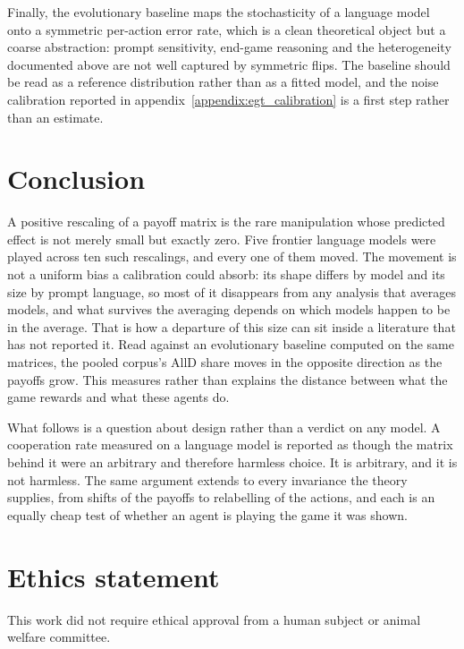 \documentclass[11pt,a4paper]{article}
\begin{document}
Finally, the evolutionary baseline maps the stochasticity of a language model
onto a symmetric per-action error rate, which is a clean theoretical object but
a coarse abstraction: prompt sensitivity, end-game reasoning and the
heterogeneity documented above are not well captured by symmetric flips. The
baseline should be read as a reference distribution rather than as a fitted
model, and the noise calibration reported in
appendix~\ref{appendix:egt_calibration} is a first step rather than an
estimate.


\section{Conclusion}\label{sec:conclusion}

A positive rescaling of a payoff matrix is the rare manipulation whose
predicted effect is not merely small but exactly zero. Five frontier language
models were played across ten such rescalings, and every one of them moved. The
movement is not a uniform bias a calibration could absorb: its shape differs by
model and its size by prompt language, so most of it disappears from any
analysis that averages models, and what survives the averaging depends on which
models happen to be in the average. That is how a departure of this size can
sit inside a literature that has not reported it. Read against an evolutionary
baseline computed on the same matrices, the pooled corpus's AllD share moves in
the opposite direction as the payoffs grow. This measures rather than explains
the distance between what the game rewards and what these agents do.

What follows is a question about design rather than a verdict on any model. A
cooperation rate measured on a language model is reported as though the matrix
behind it were an arbitrary and therefore harmless choice. It is arbitrary, and
it is not harmless. The same argument extends to every invariance the theory
supplies, from shifts of the payoffs to relabelling of the actions, and each is
an equally cheap test of whether an agent is playing the game it was shown.



\section*{Ethics statement}
This work did not require ethical approval from a human subject or animal welfare committee.
\end{document}
